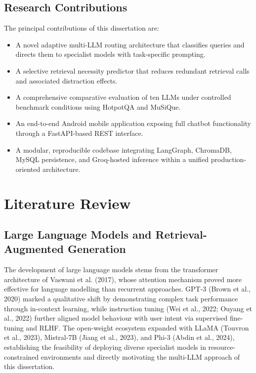 \documentclass[12pt,a4paper]{article}
\begin{document}
\subsection{Research Contributions}
\label{subsec:contributions}

The principal contributions of this dissertation are:
\begin{itemize}
    \item A novel adaptive multi-LLM routing architecture that classifies queries and directs them to specialist models with task-specific prompting.
    \item A selective retrieval necessity predictor that reduces redundant retrieval calls and associated distraction effects.
    \item A comprehensive comparative evaluation of ten LLMs under controlled benchmark conditions using HotpotQA and MuSiQue.
    \item An end-to-end Android mobile application exposing full chatbot functionality through a FastAPI-based REST interface.
    \item A modular, reproducible codebase integrating LangGraph, ChromaDB, MySQL persistence, and Groq-hosted inference within a unified production-oriented architecture.
\end{itemize}

\newpage

\section{Literature Review}
\label{sec:literature_review}

\subsection{Large Language Models and Retrieval-Augmented Generation}
\label{subsec:llm_rag}

The development of large language models stems from the transformer architecture of Vaswani et al. (2017), whose attention mechanism proved more effective for language modelling than recurrent approaches. GPT-3 (Brown et al., 2020) marked a qualitative shift by demonstrating complex task performance through in-context learning, while instruction tuning (Wei et al., 2022; Ouyang et al., 2022) further aligned model behaviour with user intent via supervised fine-tuning and RLHF. The open-weight ecosystem expanded with LLaMA (Touvron et al., 2023), Mistral-7B (Jiang et al., 2023), and Phi-3 (Abdin et al., 2024), establishing the feasibility of deploying diverse specialist models in resource-constrained environments and directly motivating the multi-LLM approach of this dissertation.
\end{document}
